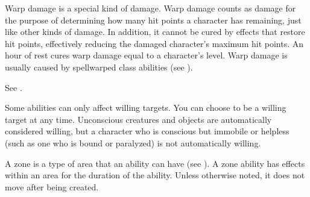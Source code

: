  Warp damage is a special kind of damage.
Warp damage counts as damage for the purpose of determining how many hit points a character has remaining, just like other kinds of damage.
In addition, it cannot be cured by effects that restore hit points, effectively reducing the damaged character's maximum hit points.
An hour of rest cures warp damage equal to a character's level.
Warp damage is usually caused by spellwarped class abilities (see ).

 See .

 Some abilities can only affect willing targets. You can choose to be a willing target at any time. Unconscious creatures and objects are automatically considered willing, but a character who is conscious but immobile or helpless (such as one who is bound or paralyzed) is not automatically willing.

 A zone is a type of area that an ability can have (see ).
A zone ability has effects within an area for the duration of the ability.
Unless otherwise noted, it does not move after being created.
